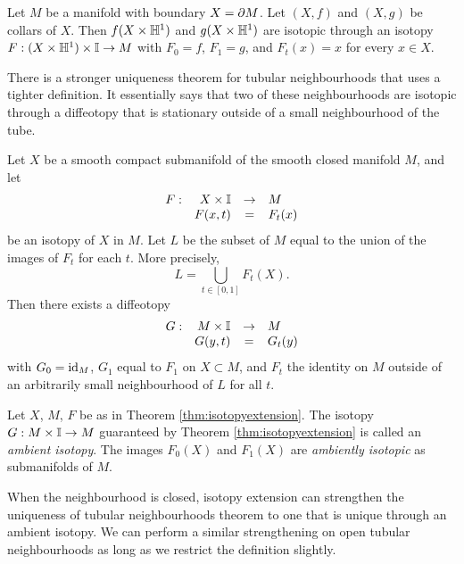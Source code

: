 \begin{theorem}
	Let $M$ be a manifold with boundary $X = \partial M$.
	Let $(X,f)$ and $(X,g)$ be collars of $X$.
	Then $f(X\times\mathbb{H}^1)$ and $g(X\times\mathbb{H}^1)$ are isotopic through an isotopy $F:(X\times\mathbb{H}^1)\times\mathbb{I}\to M$ with $F_0=f$, $F_1=g$, and $F_t(x)=x$ for every $x\in X$.	
\end{theorem}

There is a stronger uniqueness theorem for tubular neighbourhoods that uses a tighter definition.
It essentially says that two of these neighbourhoods are isotopic through a diffeotopy that is stationary outside of a small neighbourhood of the tube.

\begin{theorem}
	\label{thm:isotopyextension}
	Let $X$ be a smooth compact submanifold of the smooth closed manifold $M$, and let
	\[
		\begin{array}{crcl}
			F: & X\times\mathbb{I} & \to & M \\
			   & F(x,t) & = & F_t(x)
		\end{array}
	\]
	be an isotopy of $X$ in $M$.
	Let $L$ be the subset of $M$ equal to the union of the images of $F_t$ for each $t$.
	More precisely,
	\[
		L = \bigcup_{t\in[0,1]} F_t(X).
	\]
	Then there exists a diffeotopy 
	\[
		\begin{array}{crcl}
			G: & M\times\mathbb{I} & \to & M \\
			   & G(y,t) & = & G_t(y)				
		\end{array}
	\]
	with $G_0=\textrm{id}_{M}$, $G_1$ equal to $F_1$ on $X\subset M$, and $F_t$ the identity on $M$ outside of an arbitrarily small neighbourhood of $L$ for all $t$.
\end{theorem}

\begin{defn}
	\label{def:ambientisotopy}
	Let $X$, $M$, $F$ be as in Theorem \ref{thm:isotopyextension}.
	The isotopy $G:M\times\mathbb{I}\to M$ guaranteed by Theorem \ref{thm:isotopyextension} is called an \emph{ambient isotopy}.
	The images $F_0(X)$ and $F_1(X)$ are \emph{ambiently isotopic} as submanifolds of $M$.
\end{defn}

When the neighbourhood is closed, isotopy extension can strengthen the uniqueness of tubular neighbourhoods theorem to one that is unique through an ambient isotopy.
We can perform a similar strengthening on open tubular neighbourhoods as long as we restrict the definition slightly.

